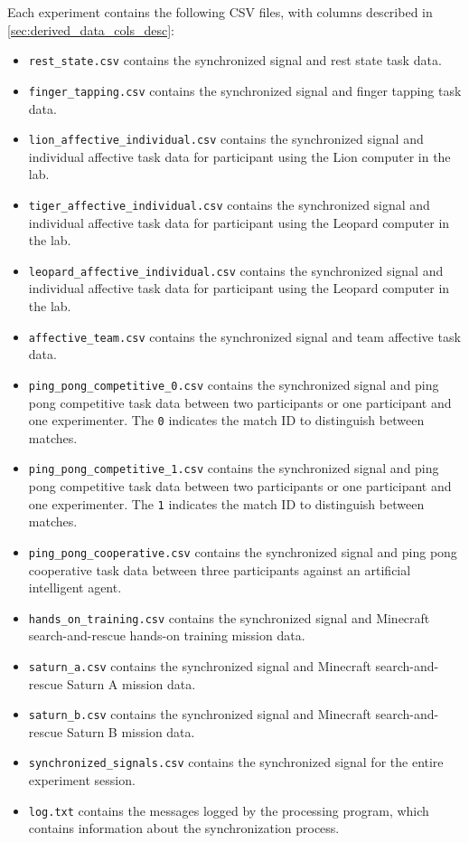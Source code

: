 Each experiment contains the following CSV files, with columns described in \ref{sec:derived_data_cols_desc}:
\begin{itemize}
  \item \texttt{rest\_state.csv} contains the synchronized signal and rest state task data.
  \item \texttt{finger\_tapping.csv} contains the synchronized signal and finger tapping task data.
  \item \texttt{lion\_affective\_individual.csv} contains the synchronized signal and individual affective task data for participant using the Lion computer in the lab.
  \item \texttt{tiger\_affective\_individual.csv} contains the synchronized signal and individual affective task data for participant using the Leopard computer in the lab.
  \item \texttt{leopard\_affective\_individual.csv} contains the synchronized signal and individual affective task data for participant using the Leopard computer in the lab.
  \item \texttt{affective\_team.csv} contains the synchronized signal and team affective task data.
  \item \texttt{ping\_pong\_competitive\_0.csv} contains the synchronized signal and ping pong competitive task data between two participants or one participant and one experimenter. The \texttt{0} indicates the match ID to distinguish between matches.
  \item \texttt{ping\_pong\_competitive\_1.csv} contains the synchronized signal and ping pong competitive task data between two participants or one participant and one experimenter. The \texttt{1} indicates the match ID to distinguish between matches.
  \item \texttt{ping\_pong\_cooperative.csv} contains the synchronized signal and ping pong cooperative task data between three participants against an artificial intelligent agent.
  \item \texttt{hands\_on\_training.csv} contains the synchronized signal and Minecraft search-and-rescue hands-on training mission data.
  \item \texttt{saturn\_a.csv} contains the synchronized signal and Minecraft search-and-rescue Saturn A mission data.
  \item \texttt{saturn\_b.csv} contains the synchronized signal and Minecraft search-and-rescue Saturn B mission data.
  \item \texttt{synchronized\_signals.csv} contains the synchronized signal for the entire experiment session.
  \item \texttt{log.txt} contains the messages logged by the processing program, which contains information about the synchronization process.
\end{itemize}

